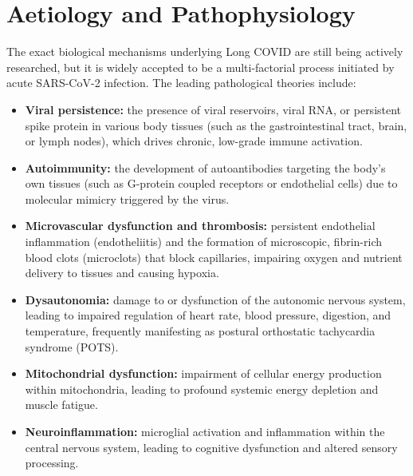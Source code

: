 \section*{Aetiology and Pathophysiology}
The exact biological mechanisms underlying Long COVID are still being actively researched, but it is widely accepted to be a multi-factorial process initiated by acute SARS-CoV-2 infection. The leading pathological theories include:
\begin{itemize}
    \item \textbf{Viral persistence:} the presence of viral reservoirs, viral RNA, or persistent spike protein in various body tissues (such as the gastrointestinal tract, brain, or lymph nodes), which drives chronic, low-grade immune activation.
    \item \textbf{Autoimmunity:} the development of autoantibodies targeting the body's own tissues (such as G-protein coupled receptors or endothelial cells) due to molecular mimicry triggered by the virus.
    \item \textbf{Microvascular dysfunction and thrombosis:} persistent endothelial inflammation (endotheliitis) and the formation of microscopic, fibrin-rich blood clots (microclots) that block capillaries, impairing oxygen and nutrient delivery to tissues and causing hypoxia.
    \item \textbf{Dysautonomia:} damage to or dysfunction of the autonomic nervous system, leading to impaired regulation of heart rate, blood pressure, digestion, and temperature, frequently manifesting as postural orthostatic tachycardia syndrome (POTS).
    \item \textbf{Mitochondrial dysfunction:} impairment of cellular energy production within mitochondria, leading to profound systemic energy depletion and muscle fatigue.
    \item \textbf{Neuroinflammation:} microglial activation and inflammation within the central nervous system, leading to cognitive dysfunction and altered sensory processing.
\end{itemize}

